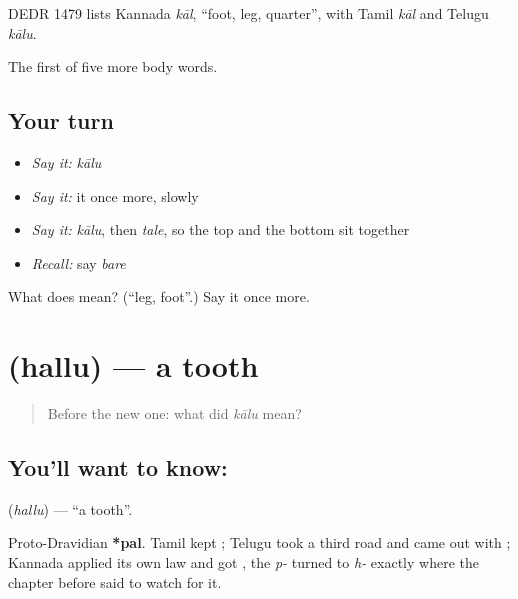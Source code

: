 DEDR 1479 lists Kannada \emph{kāl}, \textquotedblleft{}foot, leg, quarter\textquotedblright{}, with Tamil \emph{kāl} and Telugu \emph{kālu}.

\begin{grammarlens}[title={What you've built}]
The first of five more body words.
\end{grammarlens}

\subsection*{Your turn}
\begin{itemize}
\raggedright
  \item \emph{Say it:} \emph{kālu}
  \item \emph{Say it:} it once more, slowly
  \item \emph{Say it:} \emph{kālu}, then \emph{tale}, so the top and the bottom sit together
  \item \emph{Recall:} say \emph{bare}
\end{itemize}

\begin{tcolorbox}[breakable,colback=teal!4,colframe=teal!35!black,title={Before you move on}]
What does  mean? (\textquotedblleft{}leg, foot\textquotedblright{}.) Say it once more.
\end{tcolorbox}
\section[\texorpdfstring{\kn{ಹಲ್ಲು} (hallu)}{ಹಲ್ಲು (hallu)}]{ (hallu) — a tooth}

\label{lesson:KA-C47-tooth}



\begin{quote}
Before the new one: what did \emph{kālu} mean?
\end{quote}

\subsection*{You'll want to know: }
\textbf{} (\emph{hallu}) — \textquotedblleft{}a tooth\textquotedblright{}.

Proto-Dravidian \textbf{*pal}. Tamil kept ; Telugu took a third road and came out with ; Kannada applied its own law and got , the \emph{p-} turned to \emph{h-} exactly where the chapter before said to watch for it.

